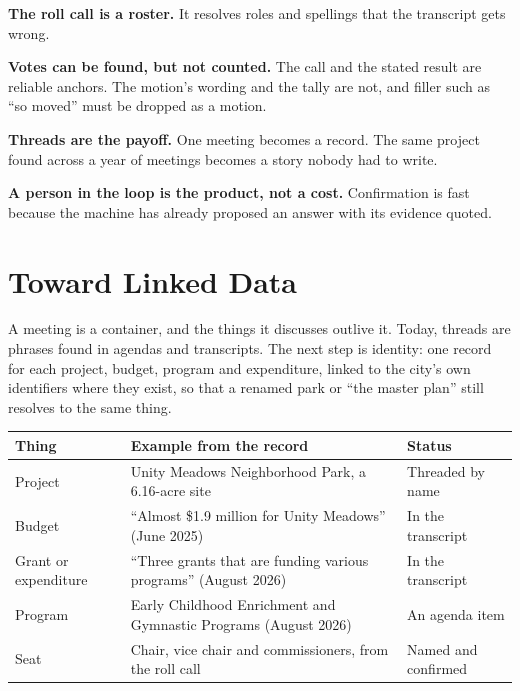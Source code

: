\documentclass[
  american,
  letterpaper,
  11pt]{article}
\begin{document}
\textbf{The roll call is a roster.}
It resolves roles and spellings that the transcript gets wrong.

\textbf{Votes can be found, but not counted.}
The call and the stated result are reliable anchors.
The motion's wording and the tally are not, and filler such as ``so moved'' must be dropped as a motion.

\textbf{Threads are the payoff.}
One meeting becomes a record.
The same project found across a year of meetings becomes a story nobody had to write.

\textbf{A person in the loop is the product, not a cost.}
Confirmation is fast because the machine has already proposed an answer with its evidence quoted.

\section{Toward Linked Data}\label{toward-linked-data}

A meeting is a container, and the things it discusses outlive it.
Today, threads are phrases found in agendas and transcripts.
The next step is identity: one record for each project, budget, program and expenditure, linked to the city's own identifiers where they exist, so that a renamed park or ``the master plan'' still resolves to the same thing.

{\def\LTcaptype{} %
\begin{longtable}[]{@{}
  >{\raggedright\arraybackslash}p{}
  >{\raggedright\arraybackslash}p{}
  >{\raggedright\arraybackslash}p{}@{}}
\toprule\noalign{}
\begin{minipage}[b]{\linewidth}\raggedright
Thing
\end{minipage} & \begin{minipage}[b]{\linewidth}\raggedright
Example from the record
\end{minipage} & \begin{minipage}[b]{\linewidth}\raggedright
Status
\end{minipage} \\
\midrule\noalign{}
\endhead
\bottomrule\noalign{}
\endlastfoot
Project & Unity Meadows Neighborhood Park, a 6.16-acre site & Threaded by name \\
Budget & ``Almost \$1.9 million for Unity Meadows'' (June 2025) & In the transcript \\
Grant or expenditure & ``Three grants that are funding various programs'' (August 2026) & In the transcript \\
Program & Early Childhood Enrichment and Gymnastic Programs (August 2026) & An agenda item \\
Seat & Chair, vice chair and commissioners, from the roll call & Named and confirmed \\
\end{longtable}
}
\end{document}
